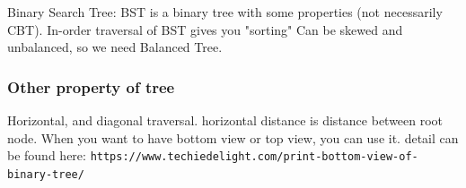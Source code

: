 \documentclass[a4paper,11pt,twoside]{book}
\begin{document}
	\par Binary Search Tree: BST is a binary tree with some properties (not necessarily CBT). In-order traversal of BST gives you "sorting" Can be skewed and unbalanced, so we need Balanced Tree.


\subsubsection{Other property of tree}

	\par Horizontal, and diagonal traversal. horizontal distance is distance between root node. When you want to have bottom view or top view, you can use it.  detail can be found here: \newline
	\verb|https://www.techiedelight.com/print-bottom-view-of-binary-tree/|
	
\end{document}
